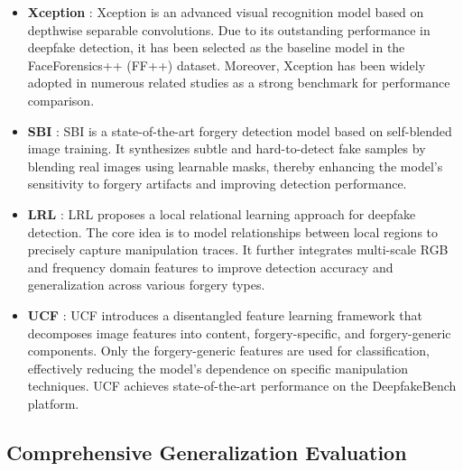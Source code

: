 \documentclass[final,5p,times]{elsarticle}
\begin{document}
\begin{itemize}
    \item \textbf{Xception} \cite{25}: Xception is an advanced visual recognition model based on depthwise separable convolutions. Due to its outstanding performance in deepfake detection, it has been selected as the baseline model in the FaceForensics++ (FF++) dataset. Moreover, Xception has been widely adopted in numerous related studies as a strong benchmark for performance comparison.
    \item \textbf{SBI} \cite{18}: SBI is a state-of-the-art forgery detection model based on self-blended image training. It synthesizes subtle and hard-to-detect fake samples by blending real images using learnable masks, thereby enhancing the model's sensitivity to forgery artifacts and improving detection performance.
    \item \textbf{LRL} \cite{28}: LRL proposes a local relational learning approach for deepfake detection. The core idea is to model relationships between local regions to precisely capture manipulation traces. It further integrates multi-scale RGB and frequency domain features to improve detection accuracy and generalization across various forgery types.
    \item \textbf{UCF} \cite{10}: UCF introduces a disentangled feature learning framework that decomposes image features into content, forgery-specific, and forgery-generic components. Only the forgery-generic features are used for classification, effectively reducing the model's dependence on specific manipulation techniques. UCF achieves state-of-the-art performance on the DeepfakeBench platform.
\end{itemize}

\subsection{Comprehensive Generalization Evaluation}
\end{document}
